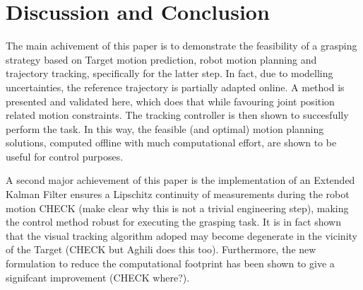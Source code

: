 \section{Discussion and Conclusion}
\label{sec:disc}
%
The main achivement of this paper is to demonstrate the feasibility of a grasping strategy based on Target motion prediction, robot motion planning and trajectory tracking, specifically for the latter step. In fact, due to modelling uncertainties, the reference trajectory is partially adapted online. A method is presented and validated here, which does that while favouring joint position related motion constraints. The tracking controller is then shown to succesfully perform the task. In this way, the feasible (and optimal) motion planning solutions,   computed offline with much computational effort, are shown to be useful for control purposes. %
%

A second major achievement of this paper is the implementation of an Extended Kalman Filter  ensures a Lipschitz continuity of measurements during the robot motion CHECK (make clear why this is not a trivial engineering step), making the control method robust for executing the grasping task. It is in fact shown that the visual tracking algorithm adoped may become degenerate in the vicinity of the Target (CHECK but Aghili does this too). Furthermore, the new formulation to reduce the computational footprint has been shown to give a signifcant improvement (CHECK where?). %

